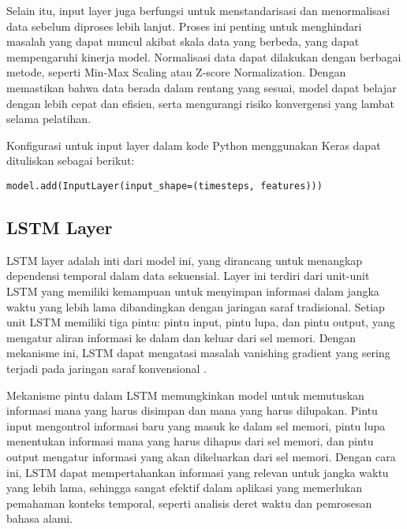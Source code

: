\par Selain itu, input layer juga berfungsi untuk menstandarisasi dan menormalisasi data sebelum diproses lebih lanjut. Proses ini penting untuk menghindari masalah yang dapat muncul akibat skala data yang berbeda, yang dapat mempengaruhi kinerja model. Normalisasi data dapat dilakukan dengan berbagai metode, seperti Min-Max Scaling atau Z-score Normalization. Dengan memastikan bahwa data berada dalam rentang yang sesuai, model dapat belajar dengan lebih cepat dan efisien, serta mengurangi risiko konvergensi yang lambat selama pelatihan.

\par Konfigurasi untuk input layer dalam kode Python menggunakan Keras dapat dituliskan sebagai berikut:
\begin{minipage}{\textwidth}
\begin{verbatim}
model.add(InputLayer(input_shape=(timesteps, features)))
\end{verbatim}
\end{minipage}

\subsection{LSTM Layer}
\par LSTM layer adalah inti dari model ini, yang dirancang untuk menangkap dependensi temporal dalam data sekuensial. Layer ini terdiri dari unit-unit LSTM yang memiliki kemampuan untuk menyimpan informasi dalam jangka waktu yang lebih lama dibandingkan dengan jaringan saraf tradisional. Setiap unit LSTM memiliki tiga pintu: pintu input, pintu lupa, dan pintu output, yang mengatur aliran informasi ke dalam dan keluar dari sel memori. Dengan mekanisme ini, LSTM dapat mengatasi masalah vanishing gradient yang sering terjadi pada jaringan saraf konvensional \cite{graves2013}.

\par Mekanisme pintu dalam LSTM memungkinkan model untuk memutuskan informasi mana yang harus disimpan dan mana yang harus dilupakan. Pintu input mengontrol informasi baru yang masuk ke dalam sel memori, pintu lupa menentukan informasi mana yang harus dihapus dari sel memori, dan pintu output mengatur informasi yang akan dikeluarkan dari sel memori. Dengan cara ini, LSTM dapat mempertahankan informasi yang relevan untuk jangka waktu yang lebih lama, sehingga sangat efektif dalam aplikasi yang memerlukan pemahaman konteks temporal, seperti analisis deret waktu dan pemrosesan bahasa alami.

